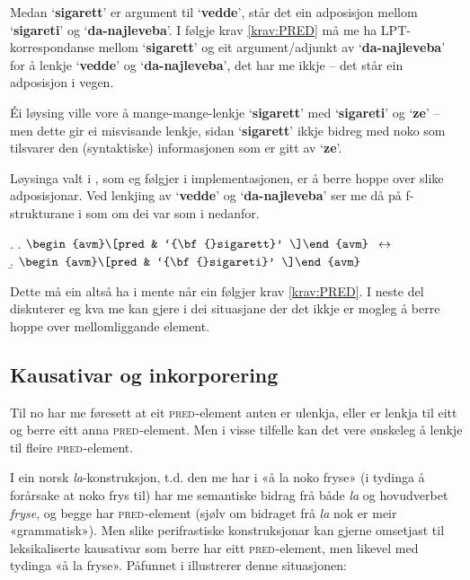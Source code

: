 \documentclass[12pt,a4paper,oneside,draft]{report}
\newcommand{\F}[2]{\textsc{#1}\ensuremath{_{#2}}}
\newcommand{\PRED}{\F{pred}{}}
\newcommand{\p}[1]{`\textbf{#1}'}
\begin{document}
 Medan \p{sigarett} er argument til \p{vedde}, står det ein adposisjon
 mellom \p{sigareti} og \p{da-najleveba}. I følgje krav
 \ref{krav:PRED} må me ha LPT-korrespondanse mellom \p{sigarett} og
 eit argument/adjunkt av \p{da-najleveba} for å lenkje \p{vedde} og
 \p{da-najleveba}, det har me ikkje -- det står ein adposisjon i vegen.

 Éi løysing ville vore å mange-mange-lenkje \p{sigarett} med
 \p{sigareti} og \p{ze} -- men dette gir ei misvisande lenkje, sidan
 \p{sigarett} ikkje bidreg med noko som tilsvarer den (syntaktiske)
 informasjonen som er gitt av \p{ze}. 

 Løysinga valt i \citet[s.~75,~fotnote~3]{dyvik2009lmp}, som eg
 følgjer i implementasjonen, er å berre hoppe over slike
 adposisjonar. Ved lenkjing av \p{vedde} og \p{da-najleveba} ser me
 då på f-strukturane i \Last som om dei var som i \Next nedanfor.

{\avmoptions{}
\ex. \a. $\begin{avm}\[pred & `{\bf{}sigarett}' \]\end{avm}\\$
     $\\\leftrightarrow$\\
     \b.     $\begin{avm}\[pred & `{\bf{}sigareti}' \]\end{avm}$

}

 Dette må ein altså ha i mente når ein følgjer krav \ref{krav:PRED}. I
 neste del diskuterer eg kva me kan gjere i dei situasjane der det
 ikkje er mogleg å berre hoppe over mellomliggande element.

\subsection{Kausativar og inkorporering}
\label{sec-3.6.5}

\label{SEC:f-mange-mange}

Til no har me føresett at eit \PRED{}-element anten er ulenkja, eller
er lenkja til eitt og berre eitt anna \PRED{}-element. Men i visse
tilfelle kan det vere ønskeleg å lenkje til fleire \PRED{}-element.

I ein norsk \emph{la}-konstruksjon, t.d. den me har i «å la noko fryse» (i
tydinga å forårsake at noko frys til) har me semantiske bidrag frå
både \emph{la} og hovudverbet \emph{fryse}, og begge har \PRED{}-element (sjølv om
bidraget frå \emph{la} nok er meir «grammatisk»). Men slike perifrastiske
konstruksjonar kan gjerne omsetjast til leksikaliserte kausativar som
berre har eitt \PRED{}-element, men likevel med tydinga «å la
fryse». Påfunnet i \Next illustrerer denne situasjonen:
\end{document}
